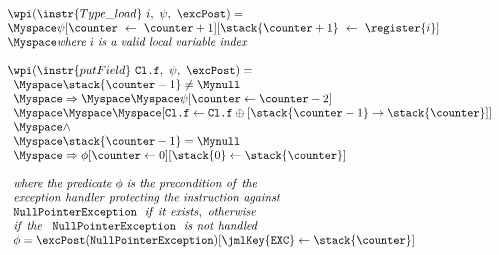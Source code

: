 \begin{figure}[ht]

$$
\begin{array}{l}
\wpi(\instr{Type\_load} \ i, \ \psi, \ \excPost) =  \\
\Myspace \psi[\counter \ \leftarrow \ \counter+1] [\stack{\counter+1} \ \leftarrow \ \register{i}] \\
 \Myspace \textit{where} \ i \ \textit{is a valid local variable index}   \\
\\ 
\wpi(\instr{putField} \ \texttt{Cl.f}, \ \psi, \ \excPost) = \\
\begin{array}{l}
   	\Myspace	\stack{\counter -1} \not= \Mynull \\
	\Myspace	\Rightarrow  
	\Myspace		%
	\Myspace	 \psi [\counter \leftarrow \counter-2 ] \\[0 mm] 
   		\Myspace\Myspace\Myspace[\texttt{Cl.f} \leftarrow \texttt{Cl.f}\oplus [\stack{\counter -1} \rightarrow \stack{\counter}] ] \\
   \Myspace	\wedge \\
   \Myspace	\stack{\counter-1} = \Mynull \\
   \Myspace	\Rightarrow  \phi[ \counter \leftarrow  0][\stack{0} \leftarrow \stack{\counter}]  \\	
	  \\
   \it{where \ the \ predicate \ \phi \  is \ the \ precondition \ of \ the} \\
   \it{exception \ handler \ protecting \ the \ instruction \  against} \\ 
   \tt{NullPointerException } \ \it{\ if \ it \  exists, \ otherwise}  \\
   \it{if \ the } \ \texttt{ NullPointerException} \ \it{\ is \ not \ handled}    \\
      \phi = \excPost(\tt{NullPointerException})[ \jmlKey{EXC} \leftarrow \stack{\counter}]
    \end{array}
 \end{array} $$


\end{figure}
